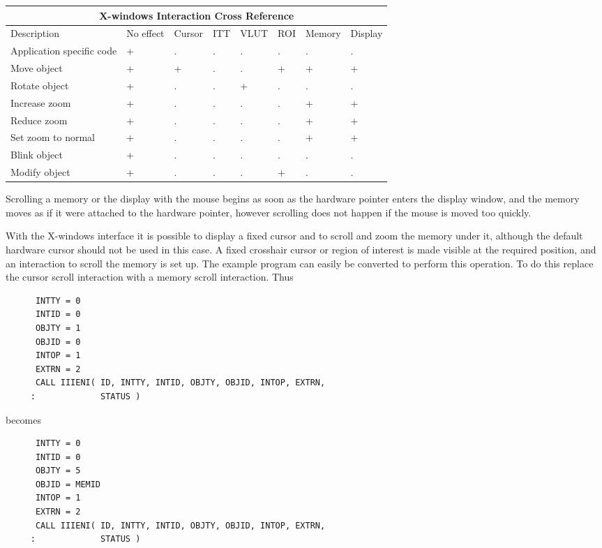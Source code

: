 \begin{small}
\begin{center}
\begin{tabular}{|p{11em}||p{3.0em}||p{3.5em}||p{2.5em}|
                |p{3.5em}||p{3.5em}||p{3.7em}||p{3.5em}|}
\hline
\multicolumn{8}{|c|}{X-windows Interaction Cross Reference} \\ \hline \hline
Description & No effect & Cursor & ITT & VLUT & ROI & Memory & Display \\
\hline
Application specific code & + & . & . & . & . & . & . \\
Move object               & + & + & . & . & + & + & + \\
Rotate object             & + & . & . & + & . & . & . \\
Increase zoom             & + & . & . & . & . & + & + \\
Reduce zoom               & + & . & . & . & . & + & + \\
Set zoom to normal        & + & . & . & . & . & + & + \\
Blink object              & + & . & . & . & . & . & . \\
Modify object             & + & . & . & . & + & . & . \\
\hline
\end{tabular}
\end{center}
\end{small}

Scrolling a memory or the display with the mouse begins as soon as the
hardware pointer enters the display window, and the memory moves as
if it were attached to the hardware pointer, however scrolling does
not happen if the mouse is moved too quickly. 

With the X-windows interface it is possible to display a fixed cursor
and to scroll and zoom the memory under it, although the default hardware
cursor should not be used in this case. A fixed crosshair cursor or region
of interest is made visible at the required position, and an interaction
to scroll the memory is set up. The example program can easily be converted
to perform this operation. To do this replace the cursor scroll interaction
with a memory scroll interaction. Thus
\begin{small}
\begin{verbatim}
      INTTY = 0
      INTID = 0
      OBJTY = 1
      OBJID = 0
      INTOP = 1
      EXTRN = 2
      CALL IIIENI( ID, INTTY, INTID, OBJTY, OBJID, INTOP, EXTRN,
     :             STATUS )
\end{verbatim}
\end{small}
becomes
\begin{small}
\begin{verbatim}
      INTTY = 0
      INTID = 0
      OBJTY = 5
      OBJID = MEMID
      INTOP = 1
      EXTRN = 2
      CALL IIIENI( ID, INTTY, INTID, OBJTY, OBJID, INTOP, EXTRN,
     :             STATUS )
\end{verbatim}
\end{small}


